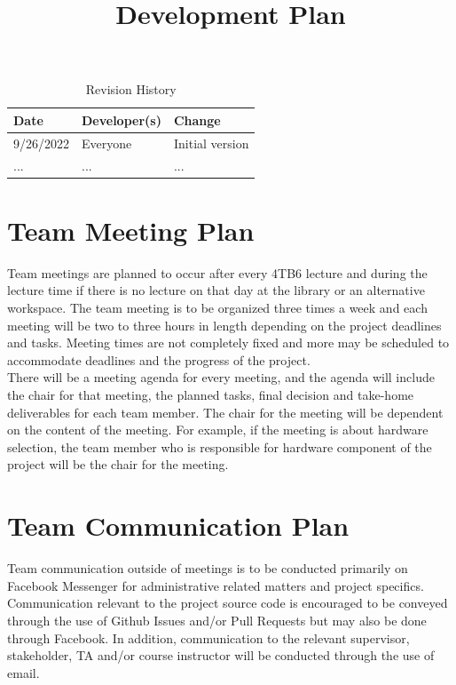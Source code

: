 \documentclass{article}
\title{Development Plan\\\progname}
\author{\authname}
\date{}
\begin{document}
\begin{table}[H]
\caption{Revision History} \label{TblRevisionHistory}
\begin{tabularx}{\textwidth}{llX}
\toprule
\textbf{Date} & \textbf{Developer(s)} & \textbf{Change}\\
\midrule
9/26/2022 & Everyone & Initial version\\

... & ... & ...\\
\bottomrule
\end{tabularx}
\end{table}

\newpage

\maketitle


\section{Team Meeting Plan}

Team meetings are planned to occur after every 4TB6 lecture and during the lecture time if there is
no lecture on that day at the library or an alternative workspace. The team meeting is to be
organized three times a week and each meeting will be two to three hours in length depending on the
project deadlines and tasks. Meeting times are not completely fixed and more may be scheduled to accommodate
deadlines and the progress of the project.\\ There will be a meeting agenda for every meeting, and the agenda
will include the chair for that meeting, the planned tasks, final decision and take-home deliverables for
each team member. The chair for the meeting will be dependent on the content of the meeting. For example,
if the meeting is about hardware selection, the team member who is responsible for hardware component of the project
will be the chair for the meeting. 

\section{Team Communication Plan}

Team communication outside of meetings is to be conducted primarily on Facebook Messenger
for administrative related matters and project specifics. Communication relevant to the project
source code is encouraged to be conveyed through the use of Github Issues and\slash or Pull Requests
but may also be done through Facebook. In addition, communication to the relevant supervisor,
stakeholder, TA and\slash or course instructor will be conducted through the use of email.
\end{document}
